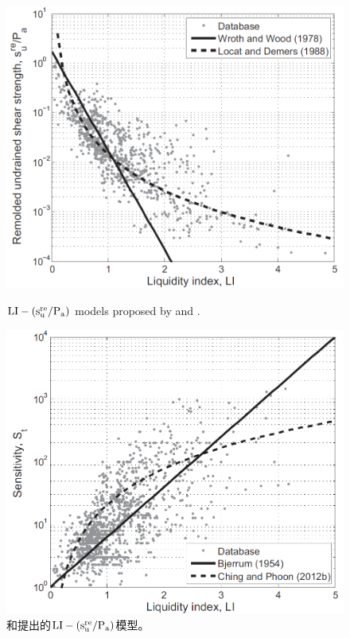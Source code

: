 \begin{figure}[!p]
    \centering
    \begin{minipage}[t]{0.48\textwidth}
        \centering
        \includegraphics[width=\textwidth]{figures/figure-2.png}
        \caption{$\rm{LI}-(s_u^{re}/P_a)$ models proposed by \citet{Wroth1978137} and \citet{Locat1988799}.}
        \vspace{-5pt}
        \addtocounter{figure}{-1}
        \renewcommand{\figurename}{图}
        \caption{\citet{Wroth1978137}和\citet{Locat1988799}提出的$\rm{LI}-(s_u^{re}/P_a)$模型。}
        \renewcommand{\figurename}{Figure}
    \end{minipage}
    \begin{minipage}[t]{0.48\textwidth}
        \centering
        \includegraphics[width=\textwidth]{figures/figure-3.png}

\end{minipage}
\end{figure}
